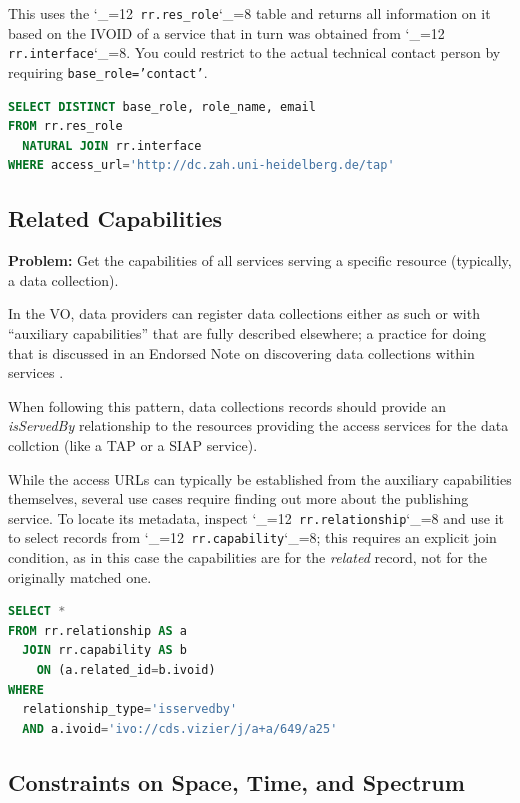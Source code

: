 \documentclass[11pt,a4paper]{ivoa}
\makeatletter
\def\rtent#1{\texttt{\color{rtcolor}\verb|#1|}}
\def\makeunderscoreletter{\catcode`\_=12}
\def\makeunderscoresubscript{\catcode`\_=8}
\def\rtent{\makeunderscoreletter\relax\rt@nt}
\def\rt@nt#1{\texttt{\color{rtcolor} #1}\makeunderscoresubscript{}}
\makeatother
\begin{document}
This uses the \rtent{rr.res_role} table and returns all information on
it based on the IVOID of a service that in turn was obtained from
\rtent{rr.interface}.  You could restrict to the actual technical
contact person by requiring \texttt{base\_role='contact'}.


\begin{lstlisting}[language=SQL,flexiblecolumns=true]
SELECT DISTINCT base_role, role_name, email
FROM rr.res_role
  NATURAL JOIN rr.interface
WHERE access_url='http://dc.zah.uni-heidelberg.de/tap'
\end{lstlisting}

\subsection{Related Capabilities}

\textbf{Problem:} Get the capabilities of all services serving a
specific resource (typically, a data collection).

In the VO, data providers can register data collections either as such
or with ``auxiliary capabilities'' that are fully described elsewhere; a
practice for doing that is discussed in an Endorsed Note on discovering
data collections within services \citep{2019ivoa.spec.0520D}.

When following this pattern, data collections records should provide an
\emph{isServedBy} relationship to the resources providing the access
services for the data collction (like a TAP or a SIAP service).

While the access URLs can typically be established from the auxiliary
capabilities themselves, several use cases require finding out more
about the publishing service.  To locate its metadata, inspect
\rtent{rr.relationship} and use it to select records
from
\rtent{rr.capability}; this requires an explicit join condition, as in
this case the capabilities are for the \emph{related} record, not for
the originally matched one.

\begin{lstlisting}[language=SQL,flexiblecolumns=true]
SELECT *
FROM rr.relationship AS a
  JOIN rr.capability AS b
    ON (a.related_id=b.ivoid)
WHERE
  relationship_type='isservedby'
  AND a.ivoid='ivo://cds.vizier/j/a+a/649/a25'
\end{lstlisting}


\subsection{Constraints on Space, Time, and Spectrum}
\end{document}
